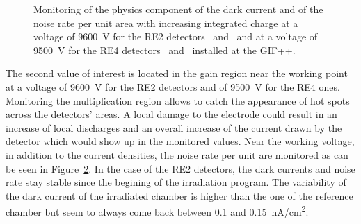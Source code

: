 \begin{figure}[H]
\begin{subfigure}{0.5\linewidth}
        	\caption{\label{fig:GIFpp-Dark-rate-mon:D}}
    	\end{subfigure}
		\caption{\label{fig:GIFpp-Dark-rate-mon} Monitoring of the physics component of the dark current and of the noise rate per unit area with increasing integrated charge at a voltage of \SI{9600}{V} for the RE2 detectors~ and~ and at a voltage of \SI{9500}{V} for the RE4 detectors~ and~ installed at the GIF++.}
	\end{figure}
	
	The second value of interest is located in the gain region near the working point at a voltage of \SI{9600}{V} for the RE2 detectors and of \SI{9500}{V} for the RE4 ones. Monitoring the multiplication region allows to catch the appearance of hot spots across the detectors' areas. A local damage to the electrode could result in an increase of local discharges and an overall increase of the current drawn by the detector which would show up in the monitored values. Near the working voltage, in addition to the current densities, the noise rate per unit are monitored as can be seen in Figure~\ref{fig:GIFpp-Dark-rate-mon}. In the case of the RE2 detectors, the dark currents and noise rate stay stable since the begining of the irradiation program. The variability of the dark current of the irradiated chamber is higher than the one of the reference chamber but seem to always come back between 0.1 and \SI{0.15}{nA/cm^2}.\\
